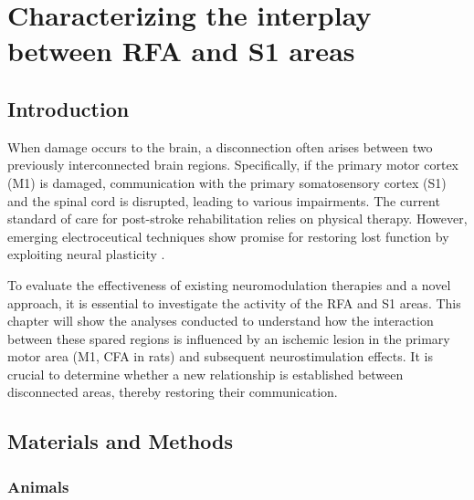 \chapter{Characterizing the interplay between RFA and S1 areas}

\section{Introduction}

When damage occurs to the brain, a disconnection often arises between two previously interconnected brain regions. Specifically, if the primary motor cortex (M1) is damaged, communication with the primary somatosensory cortex (S1) and the spinal cord is disrupted, leading to various impairments. The current standard of care for post-stroke rehabilitation relies on physical therapy. However, emerging electroceutical techniques show promise for restoring lost function by exploiting neural plasticity \cite{Carè2024}.

To evaluate the effectiveness of existing neuromodulation therapies and a novel approach, it is essential to investigate the activity of the RFA and S1 areas. This chapter will show the analyses conducted to understand how the interaction between these spared regions is influenced by an ischemic lesion in the primary motor area (M1, CFA in rats) and subsequent neurostimulation effects. It is crucial to determine whether a new relationship is established between disconnected areas, thereby restoring their communication.

\section{Materials and Methods}

\subsection{Animals}

